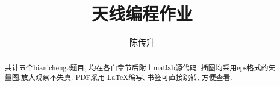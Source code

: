 \documentclass[hyperref]{ctexart}
\title{天线编程作业}
\author{陈传升}
\begin{document}
\maketitle
\newpage
\begin{abstract}
	共计五个bian'cheng2题目, 均在各自章节后附上matlab源代码. 插图均采用eps格式的矢量图,放大观察不失真. PDF采用 \LaTeX 编写, 书签可直接跳转, 方便查看. 
\end{abstract}
\tableofcontents







\end{document}
